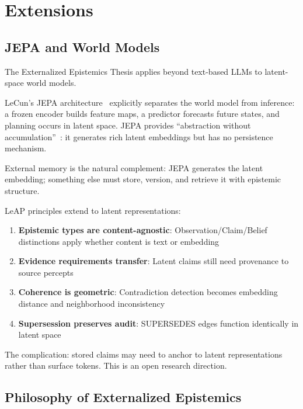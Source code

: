 \documentclass[11pt,letterpaper]{article}
\begin{document}
\section{Extensions}
\label{sec:extensions}

\subsection{JEPA and World Models}

The Externalized Epistemics Thesis applies beyond text-based LLMs to latent-space world models.

LeCun's JEPA architecture~\cite{lecun2022path} explicitly separates the world model from inference: a frozen encoder builds feature maps, a predictor forecasts future states, and planning occurs in latent space. JEPA provides ``abstraction without accumulation''~\cite{aampe2026}: it generates rich latent embeddings but has no persistence mechanism.

External memory is the natural complement: JEPA generates the latent embedding; something else must store, version, and retrieve it with epistemic structure.

LeAP principles extend to latent representations:

\begin{enumerate}[noitemsep]
    \item \textbf{Epistemic types are content-agnostic}: Observation/Claim/Belief distinctions apply whether content is text or embedding
    \item \textbf{Evidence requirements transfer}: Latent claims still need provenance to source percepts
    \item \textbf{Coherence is geometric}: Contradiction detection becomes embedding distance and neighborhood inconsistency
    \item \textbf{Supersession preserves audit}: SUPERSEDES edges function identically in latent space
\end{enumerate}

The complication: stored claims may need to anchor to latent representations rather than surface tokens. This is an open research direction.

\subsection{Philosophy of Externalized Epistemics}
\end{document}
